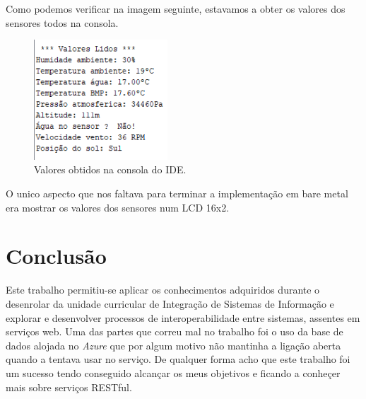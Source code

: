 \documentclass[11pt]{report}
\begin{document}
Como podemos verificar na imagem seguinte, estavamos a obter os valores dos sensores todos na consola.


\begin{figure} [!h]
\centering
\includegraphics[width=50mm]{Prints/valores_consola.png}
\caption{Valores obtidos na consola do IDE.}
\label{Rotulo}
\end{figure}

O unico aspecto que nos faltava para terminar a implementação em bare metal era mostrar os valores dos sensores num LCD 16x2.




\clearpage



\chapter*{Conclusão}

Este trabalho permitiu-se aplicar os conhecimentos adquiridos durante o desenrolar da unidade curricular de Integração de Sistemas de Informação e explorar e desenvolver processos de interoperabilidade entre sistemas, assentes em serviços web. Uma das partes que correu mal no trabalho foi o uso da base de dados alojada no \textit{Azure} que por algum motivo não mantinha a ligação aberta quando a tentava usar no serviço. De qualquer forma acho que este trabalho foi um sucesso tendo conseguido alcançar os meus objetivos e ficando a conheçer mais sobre serviços RESTful.
\end{document}
